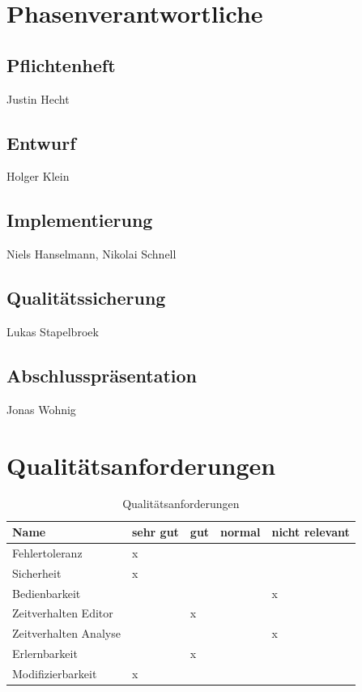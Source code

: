 \documentclass[a4paper]{scrreprt}
\begin{document}
\chapter{Phasenverantwortliche}
\section{Pflichtenheft} Justin Hecht
\section{Entwurf} Holger Klein 
\section{Implementierung} Niels Hanselmann, Nikolai Schnell
\section{Qualitätssicherung} Lukas Stapelbroek
\section{Abschlusspräsentation} Jonas Wohnig


\chapter{Qualitätsanforderungen}

\begin{table}[H]
  \centering
  \begin{tabular}{|P{3cm}|P{2cm}|P{2cm}|P{2cm}|P{2cm}|}
    Name & sehr gut & gut & normal & nicht relevant\\ \hline
    Fehlertoleranz & x &  &  &  \\ \hline
    Sicherheit & x &  &  &  \\ \hline
    Bedienbarkeit &  &  &  & x \\ \hline
  	Zeitverhalten Editor &  & x &  &  \\ \hline
  	Zeitverhalten Analyse &  &  &  & x \\ \hline
  	Erlernbarkeit &  & x &  &  \\ \hline 
    Modifizierbarkeit & x &  &  &  \\
  \end{tabular}
  \newline\newline
  \caption{Qualitätsanforderungen}\label{qa}
\end{table}


\printglossaries
 

 
\end{document}

